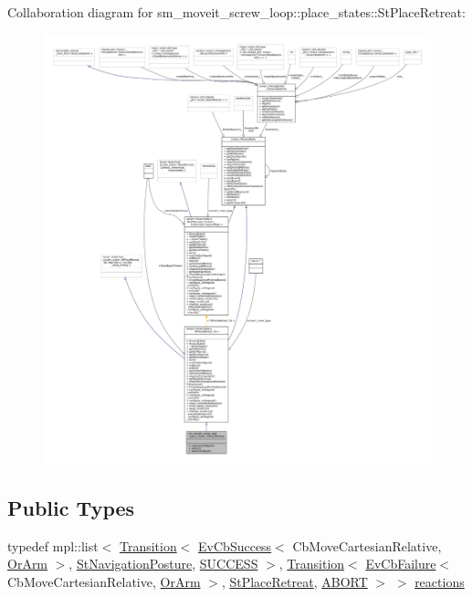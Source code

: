 Collaboration diagram for sm\+\_\+moveit\+\_\+screw\+\_\+loop\+:\+:place\+\_\+states\+:\+:St\+Place\+Retreat\+:
\nopagebreak
\begin{figure}[H]
\begin{center}
\leavevmode
\includegraphics[width=350pt]{structsm__moveit__screw__loop_1_1place__states_1_1StPlaceRetreat__coll__graph}
\end{center}
\end{figure}
\subsection*{Public Types}
\begin{DoxyCompactItemize}
\item 
typedef mpl\+::list$<$ \hyperlink{classsmacc_1_1Transition}{Transition}$<$ \hyperlink{structsmacc_1_1EvCbSuccess}{Ev\+Cb\+Success}$<$ Cb\+Move\+Cartesian\+Relative, \hyperlink{classsm__moveit__screw__loop_1_1OrArm}{Or\+Arm} $>$, \hyperlink{structsm__moveit__screw__loop_1_1place__states_1_1StNavigationPosture}{St\+Navigation\+Posture}, \hyperlink{structsmacc_1_1default__transition__tags_1_1SUCCESS}{S\+U\+C\+C\+E\+SS} $>$, \hyperlink{classsmacc_1_1Transition}{Transition}$<$ \hyperlink{structsmacc_1_1EvCbFailure}{Ev\+Cb\+Failure}$<$ Cb\+Move\+Cartesian\+Relative, \hyperlink{classsm__moveit__screw__loop_1_1OrArm}{Or\+Arm} $>$, \hyperlink{structsm__moveit__screw__loop_1_1place__states_1_1StPlaceRetreat}{St\+Place\+Retreat}, \hyperlink{structsmacc_1_1default__transition__tags_1_1ABORT}{A\+B\+O\+RT} $>$ $>$ \hyperlink{structsm__moveit__screw__loop_1_1place__states_1_1StPlaceRetreat_ad808a89770222f7f63363f28bd92056c}{reactions}
\end{DoxyCompactItemize}
